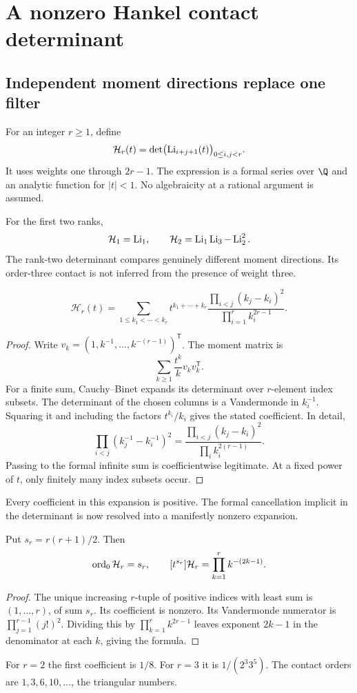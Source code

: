 \clearpage
\section{A nonzero Hankel contact determinant}\label{sec:hankel}
\subsection{Independent moment directions replace one filter}
For an integer $r\ge1$, define
\[
 \mathcal H_r(t)=\det\bigl(\operatorname{Li}_{i+j+1}(t)\bigr)_{0\le i,j<r}.
\]
It uses weights one through $2r-1$. The expression is a formal series over $\Q$ and an analytic function for $|t|<1$. No algebraicity at a rational argument is assumed.

For the first two ranks,
\[
 \mathcal H_1=\operatorname{Li}_1,\qquad
 \mathcal H_2=\operatorname{Li}_1\operatorname{Li}_3-\operatorname{Li}_2^2.
\]
The rank-two determinant compares genuinely different moment directions. Its order-three contact is not inferred from the presence of weight three.

\begin{theorem}\label{thm:hankel-expansion}
\[
 \mathcal H_r(t)=\sum_{1\le k_1<\cdots<k_r}
 t^{k_1+\cdots+k_r}
 \frac{\prod_{i<j}(k_j-k_i)^2}{\prod_{i=1}^r k_i^{2r-1}}.
\]
\end{theorem}
\begin{proof}
Write $v_k=(1,k^{-1},\ldots,k^{-(r-1)})^{\mathsf T}$. The moment matrix is
\[
 \sum_{k\ge1}\frac{t^k}{k}v_kv_k^{\mathsf T}.
\]
For a finite sum, Cauchy--Binet expands its determinant over $r$-element index subsets. The determinant of the chosen columns is a Vandermonde in $k_i^{-1}$. Squaring it and including the factors $t^{k_i}/k_i$ gives the stated coefficient. In detail,
\[
 \prod_{i<j}(k_j^{-1}-k_i^{-1})^2
 =\frac{\prod_{i<j}(k_j-k_i)^2}{\prod_i k_i^{2(r-1)}}.
\]
Passing to the formal infinite sum is coefficientwise legitimate. At a fixed power of $t$, only finitely many index subsets occur.
\end{proof}
Every coefficient in this expansion is positive. The formal cancellation implicit in the determinant is now resolved into a manifestly nonzero expansion.

\begin{theorem}\label{thm:hankel-contact}
Put $s_r=r(r+1)/2$. Then
\[
 \operatorname{ord}_0\mathcal H_r=s_r,\qquad
 [t^{s_r}]\mathcal H_r=\prod_{k=1}^r k^{-(2k-1)}.
\]
\end{theorem}
\begin{proof}
The unique increasing $r$-tuple of positive indices with least sum is $(1,\ldots,r)$, of sum $s_r$. Its coefficient is nonzero. Its Vandermonde numerator is $\prod_{j=1}^{r-1}(j!)^2$. Dividing this by $\prod_{k=1}^r k^{2r-1}$ leaves exponent $2k-1$ in the denominator at each $k$, giving the formula.
\end{proof}
For $r=2$ the first coefficient is $1/8$. For $r=3$ it is $1/(2^3 3^5)$. The contact orders are $1,3,6,10,\ldots$, the triangular numbers.

